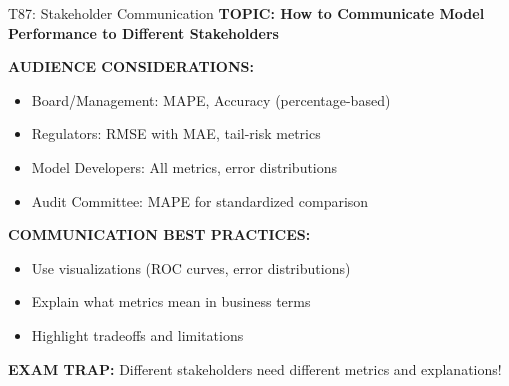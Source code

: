 \documentclass[8pt]{beamer}
\begin{document}
	\begin{frame}{T87: Stakeholder Communication}
		\fontsize{6.5}{7.5}\selectfont
		\textbf{TOPIC: How to Communicate Model Performance to Different Stakeholders}
		
		\vspace{0.1cm}
		\textbf{AUDIENCE CONSIDERATIONS:}
		\begin{itemize}
			\item \textcolor{myblue}{Board/Management:} MAPE, Accuracy (percentage-based)
			\item \textcolor{myblue}{Regulators:} RMSE with MAE, tail-risk metrics
			\item \textcolor{myblue}{Model Developers:} All metrics, error distributions
			\item \textcolor{myblue}{Audit Committee:} MAPE for standardized comparison
		\end{itemize}
		
		\vspace{0.1cm}
		\textbf{COMMUNICATION BEST PRACTICES:}
		\begin{itemize}
			\item Use visualizations (ROC curves, error distributions)
			\item Explain what metrics mean in business terms
			\item Highlight tradeoffs and limitations
		\end{itemize}
		
		\textcolor{myred}{\textbf{EXAM TRAP:}} Different stakeholders need \textcolor{myblue}{different metrics and explanations}!
	\end{frame}
	
\end{document}
